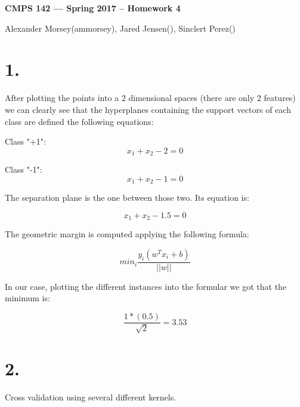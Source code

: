 \documentclass[11pt]{article}
\begin{document}
\begin{center}
{\bf\Large CMPS 142 --- Spring 2017 --  Homework 4}
\end{center}
Alexander Morsey(ammorsey), Jared Jensen(), Sinclert Perez()

\section*{1.}
After plotting the points into a 2 dimensional spaces (there are only 2 features)
we can clearly see that the hyperplanes containing the support vectors of each class
are defined the following equations:

Class "+1": \begin{equation}
            x_1 + x_2 - 2 = 0
            \end{equation}

Class "-1": \begin{equation}
            x_1 + x_2 - 1 = 0
            \end{equation}


The separation plane is the one between those two. Its equation is:

\begin{equation}
x_1 + x_2 - 1.5 = 0
\end{equation}


The geometric margin is computed applying the following formula:

\begin{equation}
min_i \frac {y_i(w^Tx_i+b)}{||w||}
\end{equation}

In our case, plotting the different instances into the formular we got that the minimum is:

\begin{equation}
\frac {1 * (0.5)}{\sqrt{2}} = 3.53
\end{equation}
\section*{2.}
Cross validation using several different kernels.
\end{document}
